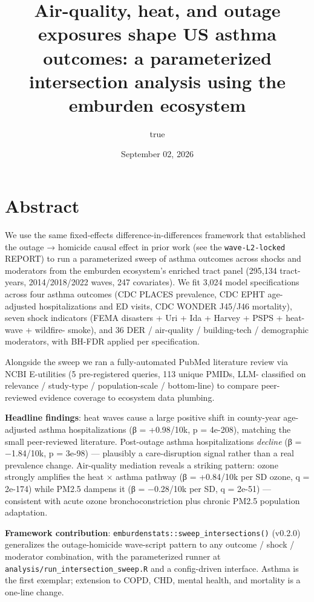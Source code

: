 \documentclass[
]{article}
\title{Air-quality, heat, and outage exposures shape US asthma outcomes:
a parameterized intersection analysis using the emburden ecosystem}
\author{true}
\date{September 02, 2026}
\begin{document}
\maketitle

\hypertarget{abstract}{%
\section{Abstract}\label{abstract}}

We use the same fixed-effects difference-in-differences framework that
established the outage → homicide causal effect in prior work (see the
\texttt{wave-L2-locked} REPORT) to run a parameterized sweep of asthma
outcomes across shocks and moderators from the emburden ecosystem's
enriched tract panel (295,134 tract-years, 2014/2018/2022 waves, 247
covariates). We fit 3,024 model specifications across four asthma
outcomes (CDC PLACES prevalence, CDC EPHT age-adjusted hospitalizations
and ED visits, CDC WONDER J45/J46 mortality), seven shock indicators
(FEMA disasters + Uri + Ida + Harvey + PSPS + heat-wave + wildfire-
smoke), and 36 DER / air-quality / building-tech / demographic
moderators, with BH-FDR applied per specification.

Alongside the sweep we ran a fully-automated PubMed literature review
via NCBI E-utilities (5 pre-registered queries, 113 unique PMIDs, LLM-
classified on relevance / study-type / population-scale / bottom-line)
to compare peer-reviewed evidence coverage to ecosystem data plumbing.

\textbf{Headline findings}: heat waves cause a large positive shift in
county-year age-adjusted asthma hospitalizations (β = +0.98/10k, p =
4e-208), matching the small peer-reviewed literature. Post-outage asthma
hospitalizations \emph{decline} (β = −1.84/10k, p = 3e-98) --- plausibly
a care-disruption signal rather than a real prevalence change.
Air-quality mediation reveals a striking pattern: ozone strongly
amplifies the heat × asthma pathway (β = +0.84/10k per SD ozone, q =
2e-174) while PM2.5 dampens it (β = −0.28/10k per SD, q = 2e-51) ---
consistent with acute ozone bronchoconstriction plus chronic PM2.5
population adaptation.

\textbf{Framework contribution}:
\texttt{emburdenstats::sweep\_intersections()} (v0.2.0) generalizes the
outage-homicide wave-script pattern to any outcome / shock / moderator
combination, with the parameterized runner at
\texttt{analysis/run\_intersection\_sweep.R} and a config-driven
interface. Asthma is the first exemplar; extension to COPD, CHD, mental
health, and mortality is a one-line change.
\end{document}
